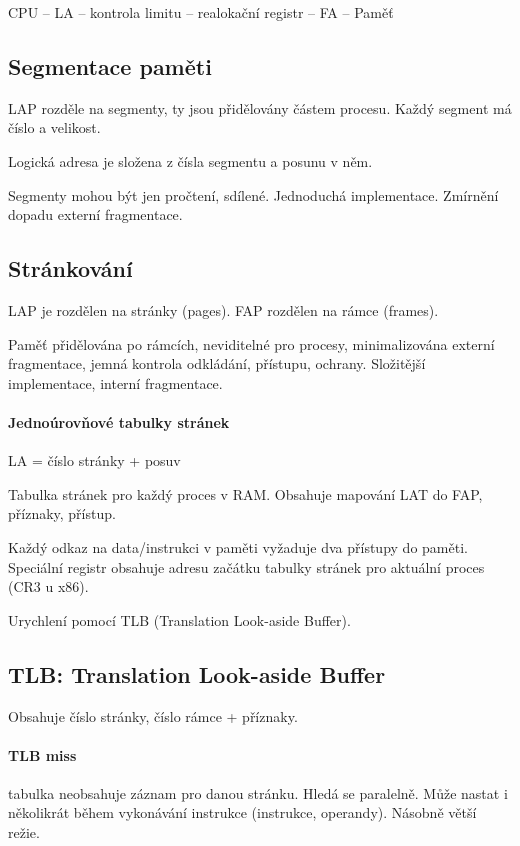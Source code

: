 \documentclass[a4paper, 11pt]{report}
\begin{document}
CPU -- LA -- kontrola limitu -- realokační registr -- FA -- Paměť

\subsection{Segmentace paměti}

LAP rozděle na segmenty, ty jsou přidělovány částem procesu. Každý segment má číslo a velikost.

Logická adresa je složena z čísla segmentu a posunu v něm.

Segmenty mohou být jen pročtení, sdílené. Jednoduchá implementace. Zmírnění dopadu externí fragmentace.

\subsection{Stránkování}

LAP je rozdělen na stránky (pages). FAP rozdělen na rámce (frames).

Paměť přidělována po rámcích, neviditelné pro procesy, minimalizována externí fragmentace, jemná kontrola odkládání, přístupu, ochrany. Složitější implementace, interní fragmentace.

\paragraph{Jednoúrovňové tabulky stránek}
LA = číslo stránky + posuv

Tabulka stránek pro každý proces v RAM. Obsahuje mapování LAT do FAP, příznaky, přístup.

Každý odkaz na data/instrukci v paměti vyžaduje dva přístupy do paměti. Speciální registr obsahuje adresu začátku tabulky stránek pro aktuální proces (CR3 u x86).

Urychlení pomocí TLB (Translation Look-aside Buffer).

\subsection{TLB: Translation Look-aside Buffer}

Obsahuje číslo stránky, číslo rámce + příznaky.

\paragraph{TLB miss}
tabulka neobsahuje záznam pro danou stránku. Hledá se paralelně. Může nastat i několikrát během vykonávání instrukce (instrukce, operandy). Násobně větší režie.
\end{document}
